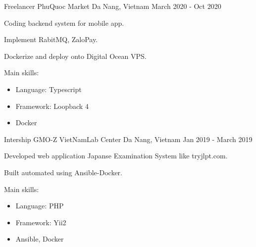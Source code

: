 \begin{cventries}
  \cventry
    {Freelancer} %
    {PhuQuoc Market} %
    {Da Nang, Vietnam} %
    {March 2020 - Oct 2020} %
    {
      \begin{cvitems} %
        \item {Coding backend system for mobile app.}
        \item {Implement RabitMQ, ZaloPay.}
        \item {Dockerize and deploy onto Digital Ocean VPS.}
        \item {Main skills:
        	\begin{itemize}
        		\item {Language: Typescript}
  				\item {Framework: Loopback 4}
  				\item {Docker}
			\end{itemize}
        }
      \end{cvitems}
    }

  \cventry
    {Intership} %
    {GMO-Z VietNamLab Center} %
    {Da Nang, Vietnam} %
    {Jan 2019 - March 2019} %
    {
      \begin{cvitems} %
        \item {Developed web application Japanse Examination System like tryjlpt.com.}
        \item {Built automated using Ansible-Docker.}
        \item {Main skills:
        	\begin{itemize}
        		\item {Language: PHP}
  				\item {Framework: Yii2}
  				\item {Ansible, Docker}
			\end{itemize}
        }
      \end{cvitems}
    }

\end{cventries}